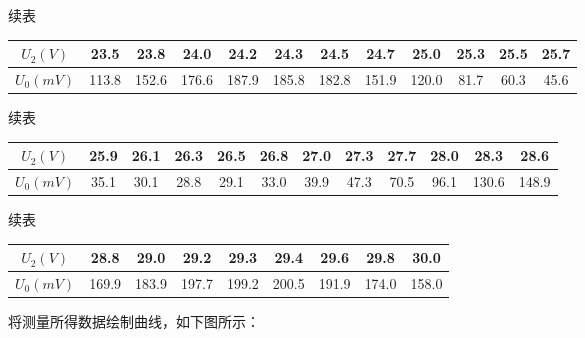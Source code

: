 \documentclass{article}
\begin{document}
    续表

    \begin{center}
        \begin{tabular}{|c|c|c|c|c|c|c|c|c|c|c|c|}
            \hline
            $U_2(V)$ & 23.5  & 23.8  & 24.0  & 24.2  & 24.3  & 24.5  & 24.7  & 25.0  & 25.3  & 25.5  & 25.7  \bigstrut\\
            \hline
            $U_0(mV)$ & 113.8  & 152.6  & 176.6  & 187.9  & 185.8  & 182.8  & 151.9  & 120.0  & 81.7  & 60.3  & 45.6  \bigstrut\\
            \hline
        \end{tabular}%
    \end{center}

    续表

    \begin{center}
        \begin{tabular}{|c|c|c|c|c|c|c|c|c|c|c|c|}
            \hline
            $U_2(V)$ & 25.9  & 26.1  & 26.3  & 26.5  & 26.8  & 27.0  & 27.3  & 27.7  & 28.0  & 28.3  & 28.6  \bigstrut\\
            \hline
            $U_0(mV)$ & 35.1  & 30.1  & 28.8  & 29.1  & 33.0  & 39.9  & 47.3  & 70.5  & 96.1  & 130.6  & 148.9  \bigstrut\\
            \hline
        \end{tabular}%
    \end{center}

    续表

    \begin{center}
        \begin{tabular}{|c|c|c|c|c|c|c|c|c|}
            \hline
            $U_2(V)$ & 28.8  & 29.0  & 29.2  & 29.3  & 29.4  & 29.6  & 29.8  & 30.0  \bigstrut\\
            \hline
            $U_0(mV)$ & 169.9  & 183.9  & 197.7  & 199.2  & 200.5  & 191.9  & 174.0  & 158.0  \bigstrut\\
            \hline
        \end{tabular}%
    \end{center}

    将测量所得数据绘制曲线，如下图所示：
    
\end{document}
